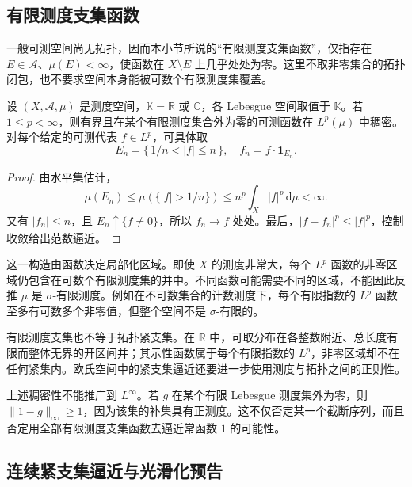 \subsection{有限测度支集函数}
\label{b1:subsec:100203}

一般可测空间尚无拓扑，因而本小节所说的“有限测度支集函数”，仅指存在 \(E\in\mathcal A\)、\(\mu(E)<\infty\)，使函数在 \(X\setminus E\) 上几乎处处为零。这里不取非零集合的拓扑闭包，也不要求空间本身能被可数个有限测度集覆盖。

\begin{proposition}\label{b1:prop:lp-finite-support-dense}
设 \((X,\mathcal A,\mu)\) 是测度空间，\(\mathbb K=\mathbb R\) 或 \(\mathbb C\)，各 Lebesgue 空间取值于 \(\mathbb K\)。若 \(1\leq p<\infty\)，则有界且在某个有限测度集合外为零的可测函数在 \(L^p(\mu)\) 中稠密。对每个给定的可测代表 \(f\in L^p\)，可具体取
\[
 E_n=\{\,1/n<|f|\leq n\,\},\quad f_n=f\cdot\mathbf1_{E_n}.
\]
\end{proposition}
\begin{proof}
由水平集估计，
\[
 \mu(E_n)\leq\mu(\{|f|>1/n\})
 \leq n^p\int_X|f|^p\,\mathrm d\mu<\infty.
\]
又有 \(|f_n|\leq n\)，且 \(E_n\uparrow\{f\ne0\}\)，所以 \(f_n\to f\) 处处。最后，\(|f-f_n|^p\leq|f|^p\)，控制收敛给出范数逼近。
\end{proof}

这一构造由函数决定局部化区域。即使 \(X\) 的测度非常大，每个 \(L^p\) 函数的非零区域仍包含在可数个有限测度集的并中。不同函数可能需要不同的区域，不能因此反推 \(\mu\) 是 \(\sigma\)-有限测度。例如在不可数集合的计数测度下，每个有限指数的 \(L^p\) 函数至多有可数多个非零值，但整个空间不是 \(\sigma\)-有限的。

\ProseParagraphBreak

有限测度支集也不等于拓扑紧支集。在 \(\mathbb R\) 中，可取分布在各整数附近、总长度有限而整体无界的开区间并；其示性函数属于每个有限指数的 \(L^p\)，非零区域却不在任何紧集内。欧氏空间中的紧支集逼近还要进一步使用测度与拓扑之间的正则性。

\ProseParagraphBreak

上述稠密性不能推广到 \(L^\infty\)。若 \(g\) 在某个有限 Lebesgue 测度集外为零，则 \(\|1-g\|_\infty\geq1\)，因为该集的补集具有正测度。这不仅否定某一个截断序列，而且否定用全部有限测度支集函数去逼近常函数 \(1\) 的可能性。

\subsection{连续紧支集逼近与光滑化预告}
\label{b1:subsec:100204}

